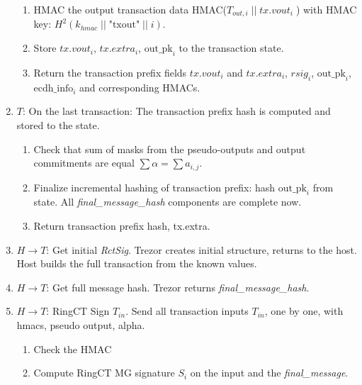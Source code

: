 \documentclass[]{article}
\begin{document}
\begin{enumerate}
\begin{enumerate}
        \item HMAC the output transaction data HMAC($T_{out,i} \; || \; tx.vout_i \; $) with HMAC key: $H^2(k_{hmac} \; || \; \text{"txout"} \; || \; i)$.
                
        \item Store $tx.vout_i$, $tx.extra_i$, $\text{out\_pk}_i$ to the transaction state.
        
		\item Return the transaction prefix fields $tx.vout_i$ and $tx.extra_i$, $rsig_i$, $\text{out\_pk}_i$, $\text{ecdh\_info}_i$ and corresponding HMACs.
		
	\end{enumerate}
	  
	\item $T$: On the last transaction: The transaction prefix hash is computed and stored to the state. 
	
	\begin{enumerate}
		\item Check that sum of masks from the pseudo-outputs and output commitments are equal $\sum \alpha = \sum a_{i,j}$.
		
		\item Finalize incremental hashing of transaction prefix: hash $\text{out\_pk}_i$ from state. All \emph{final\_message\_hash} components are complete now. 
		
		\item Return transaction prefix hash, tx.extra.
	\end{enumerate} 

	\item $H \rightarrow T$: Get initial \emph{RctSig}. Trezor creates initial structure, returns to the host. Host builds the full transaction from the known values.

	\item $H \rightarrow T$: Get full message hash. Trezor returns \emph{final\_message\_hash}.
	
	\item $H \rightarrow T$: RingCT Sign $T_{in}$. Send all transaction inputs $T_{in}$, one by one, with hmacs, pseudo output, alpha.
	\begin{enumerate}
		\item Check the HMAC
		
		\item Compute RingCT MG signature $S_i$ on the input and the \emph{final\_message}.
		
	\end{enumerate} 
	
\end{enumerate}
\end{document}
